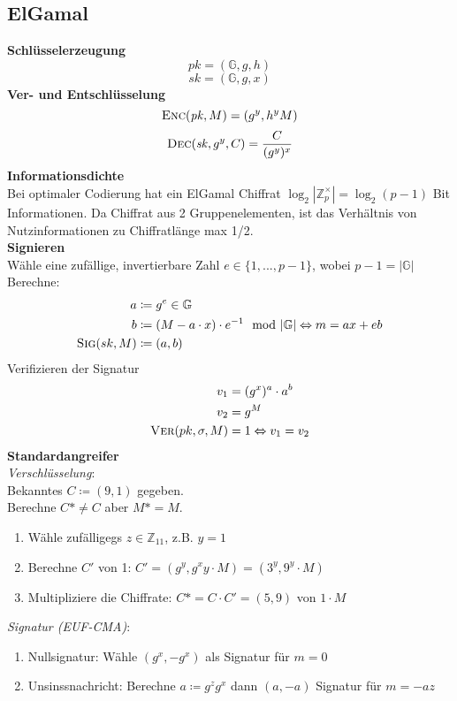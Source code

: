 \documentclass[10pt,a4paper]{article}
\begin{document}
        \subsection{ElGamal}
        \textbf{Schlüsselerzeugung}
        \[\mathit{pk} = (\mathbb{G},g,h)\]
        \[\mathit{sk} = (\mathbb{G},g,x)\]
        \textbf{Ver- und Entschlüsselung}
        \[\textsc{Enc}(\mathit{pk}, M) = (g^y, h^yM)\]
        \[\textsc{Dec}(\mathit{sk}, g^y, C) = \frac{C}{(g^y)^x}\]
        \textbf{Informationsdichte}\\
        Bei optimaler Codierung hat ein ElGamal Chiffrat \(\log_2 | \mathbb{Z}_p^{\times}| = \log_2(p-1)\)
        Bit Informationen. Da Chiffrat aus 2 Gruppenelementen, ist das Verhältnis von Nutzinformationen zu Chiffratlänge max 1/2. \\
        \textbf{Signieren}\\
        Wähle eine zufällige, invertierbare Zahl \(e \in \{1,..., p-1\}\), wobei \(p - 1 = |\mathbb{G}|\)
        Berechne:
        \begin{align*}
          a &\coloneqq g^e \in \mathbb{G} \\
          b &\coloneqq (M - a \cdot x) \cdot e^{-1} \mod |\mathbb{G}| \Leftrightarrow m = ax + eb\\
          \textsc{Sig}(sk, M) &\coloneqq (a,b)
        \end{align*}
        Verifizieren der Signatur
        \begin{align*}
          v_1 &= (g^x)^a \cdot a^b\\
          v_2 &= g^M\\
          \textsc{Ver}(pk,\sigma, M) &= 1 \Leftrightarrow v_1 = v_2
        \end{align*}
        \textbf{Standardangreifer}\\
        \textit{Verschlüsselung}:\\
        Bekanntes \(C \coloneqq (9,1)\) gegeben.\\
        Berechne \(C* \neq C\) aber \(M* = M\).
        \begin{enumerate}
        \item Wähle zufälligegs \(z \in \mathbb{Z}_{11}\), z.B. \(y=1\)
        \item Berechne \(C'\) von 1: \(C' = (g^y, g^xy \cdot M) = (3^y, 9^y \cdot M)\)
        \item Multipliziere die Chiffrate: \(C* = C \cdot C' = (5,9)\) von \(1 \cdot M\)
        \end{enumerate}
        \textit{Signatur (EUF-CMA)}:
        \begin{enumerate}
        \item Nullsignatur: Wähle \((g^x, -g^x)\) als Signatur für \(m=0\)
          \item Unsinssnachricht: Berechne \(a \coloneqq g^zg^x\) dann \((a, -a)\) Signatur für \(m=-az\)
        \end{enumerate}
\end{document}

